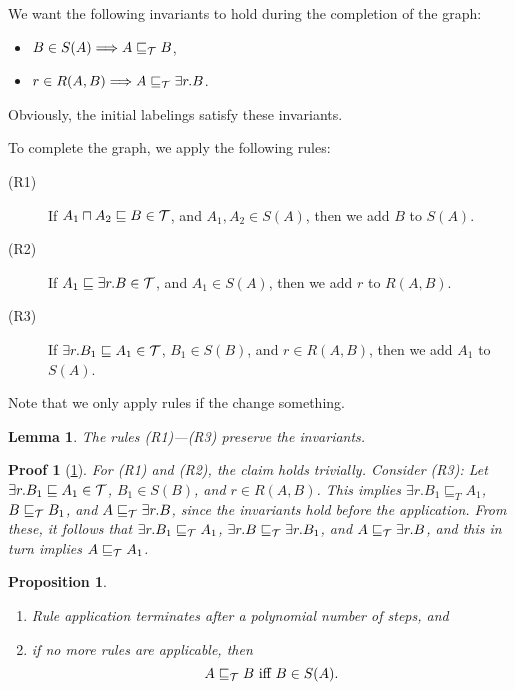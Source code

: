 \documentclass[openany]{scrbook}
\theoremstyle{break}
\newtheorem{Lemma}[Theorem]{Lemma}
\newtheorem{Proposition}[Theorem]{Proposition}
\theoremstyle{nonumberbreak}
\theoremstyle{nonumberplain}
\theoremstyle{nonumberbreak}
\newtheorem{Proof}{Proof}
\newcommand{\then}{\Longrightarrow}
\begin{document}
We want the following invariants to hold during the completion of the
graph:
\begin{itemize}
\item $B \in S(A) \then A \sqsubseteq_{\cal T} B$,
\item $r \in R(A, B) \then A \sqsubseteq_{\cal T} \exists r.B$.
\end{itemize}

Obviously, the initial labelings satisfy these invariants.

To complete the graph, we apply the following rules:
\begin{description}
\item[(R1)] If $A_1 \sqcap A_2 \sqsubseteq B \in {\cal T}$, and $A_1,
  A_2 \in S(A)$, then we add $B$ to $S(A)$.
\item[(R2)] If $A_1 \sqsubseteq \exists r.B \in {\cal T}$, and $A_1
  \in S(A)$, then we add $r$ to $R(A, B)$.
\item[(R3)] If $\exists r.B_1 \sqsubseteq A_1 \in {\cal T}$, $B_1 \in
  S(B)$, and $r \in R(A, B)$, then we add $A_1$ to $S(A)$.
\end{description}

Note that we only apply rules if the change something.

\begin{Lemma}
  \label{5.16}
  The rules (R1)---(R3) preserve the invariants.
\end{Lemma}

\begin{Proof}[\cref{5.16}]
  For (R1) and (R2), the claim holds trivially. Consider (R3): Let
  $\exists r.B_1 \sqsubseteq A_1 \in {\cal T}$, $B_1 \in S(B)$, and $r
  \in R(A, B)$. This implies $\exists r.B_1 \sqsubseteq_T A_1$, $B
  \sqsubseteq_{\cal T} B_1$, and $A \sqsubseteq_{\cal T} \exists
  r.B$, since the invariants hold before the application. From these,
  it follows that $\exists r.B_1 \sqsubseteq_{\cal T} A_1$, $\exists
  r.B \sqsubseteq_{\cal T} \exists r.B_1$, and $A \sqsubseteq_{\cal T}
  \exists r.B$, and this in turn implies $A \sqsubseteq_{\cal T} A_1$.
\end{Proof}

\begin{Proposition}
  \label{5.17}
  \begin{enumerate}
  \item Rule application terminates after a polynomial number of
    steps, and
  \item if no more rules are applicable, then
    \begin{equation*}
      A \sqsubseteq_{\cal T} B\ \text{iff}\ B \in S(A).
    \end{equation*}
  \end{enumerate}
\end{Proposition}
\end{document}

